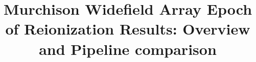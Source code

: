 \documentclass[preprint2]{aastex}
\makeatletter
\def\ASU{\altaffilmark{1}}
\def\ASUtxt{\altaffiltext{1}{Arizona State University, School of Earth and Space Exploration, Tempe, AZ 85287, USA}}
\def\myemail{\altaffilmark{*}}
\def\myemailtxt{\altaffiltext{*}{e-mail: daniel.c.jacobs@asu.edu}}
\def\UW{\altaffilmark{2}}
\def\UWtxt{\altaffiltext{2}{University of Washington, Department of Physics, Seattle, WA 98195, USA}}
\def\SKASA{\altaffilmark{3}}
\def\SKASAtxt{\altaffiltext{3}{Square Kilometre Array South Africa (SKA SA), Park Road, Pinelands 7405, South Africa}}
\def\RU{\altaffilmark{4}}
\def\RUtxt{\altaffiltext{4}{Department of Physics and Electronics, Rhodes University, Grahamstown 6140, South Africa}}
\def\CfA{\altaffilmark{5}}
\def\CfAtxt{\altaffiltext{5}{Harvard-Smithsonian Center for Astrophysics, Cambridge, MA 02138, USA}}
\def\ANU{\altaffilmark{6}}
\def\ANUtxt{\altaffiltext{6}{Australian National University, Research School of Astronomy and Astrophysics, Canberra, ACT 2611, Australia}}
\def\CAASTRO{\altaffilmark{7}}
\def\CAASTROtxt{\altaffiltext{7}{ARC Centre of Excellence for All-sky Astrophysics (CAASTRO)}}
\def\Haystack{\altaffilmark{8}}
\def\Haystacktxt{\altaffiltext{8}{MIT Haystack Observatory, Westford, MA 01886, USA}}
\def\MIT{\altaffilmark{9}}
\def\MITtxt{\altaffiltext{9}{MIT Kavli Institute for Astrophysics and Space Research, Cambridge, MA 02139, USA}}
\def\Curtin{\altaffilmark{10}}
\def\Curtintxt{\altaffiltext{10}{International Centre for Radio Astronomy Research, Curtin University, Perth, WA 6845, Australia}}
\def\Victoria{\altaffilmark{11}}
\def\Victoriatxt{\altaffiltext{11}{Victoria University of Wellington, School of Chemical \& Physical Sciences, Wellington 6140, New Zealand}}
\def\UWisc{\altaffilmark{12}}
\def\UWisctxt{\altaffiltext{12}{University of Wisconsin--Milwaukee, Department of Physics, Milwaukee, WI 53201, USA}}
\def\UMichigan{\altaffilmark{13}}
\def\UMichigantxt{\altaffiltext{13}{University of Michigan, Department of Atmospheric, Oceanic and Space Sciences, Ann Arbor, MI 48109, USA}}
\def\UMelbourne{\altaffilmark{14}}
\def\UMelbournetxt{\altaffiltext{14}{The University of Melbourne, School of Physics, Parkville, VIC 3010, Australia}}
\def\USydney{\altaffilmark{15}}
\def\USydneytxt{\altaffiltext{15}{The University of Sydney, Sydney Institute for Astronomy, School of Physics, NSW 2006, Australia}}
\def\CASS{\altaffilmark{16}}
\def\CASStxt{\altaffiltext{16}{CSIRO Astronomy and Space Science (CASS), PO Box 76, Epping, NSW 1710, Australia}}
\def\Tata{\altaffilmark{17}}
\def\Tatatxt{\altaffiltext{17}{National Centre for Radio Astrophysics, Tata Institute for Fundamental Research, Pune 411007, India}}
\def\RRI{\altaffilmark{18}}
\def\RRItxt{\altaffiltext{18}{Raman Research Institute, Bangalore 560080, India}}
\def\NRAO{\altaffilmark{19}}
\def\NRAOtxt{\altaffiltext{19}{National Radio Astronomy Observatory, Charlottesville and Greenbank, USA}}
\def\UWA{\altaffilmark{20}}
\def\UWAtxt{\altaffiltext{20}{International Centre for Radio Astronomy Research, University of Western Australia, Crawley, WA 6009, Australia}}
\makeatother
\begin{document}

\title{Murchison Widefield Array Epoch of Reionization Results: Overview and Pipeline comparison}





%
\end{document}
